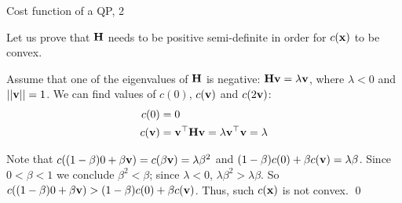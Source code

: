 \documentclass{beamer}
\begin{document}
\begin{frame}{Cost function of a QP, 2}
	\begin{flushleft}
		
		Let us prove that $\mathbf{H}$ needs to be positive semi-definite in order for $c(\mathbf{x})$ to be convex.
		
		\bigskip
		
		Assume that one of the eigenvalues of $\mathbf{H}$ is negative: $\mathbf{H}\mathbf{v} = \lambda\mathbf{v}$, where $\lambda < 0$ and $||\mathbf{v}|| = 1$. We can find values of $c(0)$, $c(\mathbf{v})$ and $c(2\mathbf{v})$:
		\begin{align}
			c(0) &= 0 \\
			c(\mathbf{v}) &= \mathbf{v}^\top \mathbf{H}\mathbf{v} =  \lambda \mathbf{v}^\top \mathbf{v} =  \lambda
		\end{align}
		
		Note that $c((1 - \beta) 0 + \beta \mathbf{v}) = c(\beta\mathbf{v}) =  \lambda \beta^2$ and $(1 - \beta) c(0) + \beta c(\mathbf{v}) = \lambda \beta$. Since $0 < \beta < 1$ we conclude $\beta^2 < \beta$; since $\lambda < 0$, $\lambda \beta^2 > \lambda \beta$. So $c((1 - \beta) 0 + \beta \mathbf{v}) >  (1 - \beta) c(0) + \beta c(\mathbf{v})$. Thus, such $c(\mathbf{x})$ is not convex. \qed
		
	\end{flushleft}
\end{frame}
\end{document}
